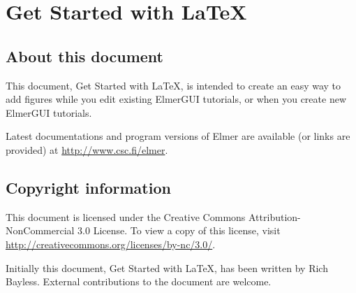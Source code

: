 \chapter*{Get Started with LaTeX}

\section*{About this document}

This document, Get Started with LaTeX, is intended to create an easy
way to add figures while you edit existing ElmerGUI tutorials, or when
you create new ElmerGUI tutorials. 

Latest documentations and program versions of Elmer are available (or links are provided) at 
\url{http://www.csc.fi/elmer}. 

\section*{Copyright information}

This document is licensed under the Creative Commons Attribution-NonCommercial 3.0 License. 
To view a copy of this license, visit \url{http://creativecommons.org/licenses/by-nc/3.0/}.

Initially this document, Get Started with LaTeX, has been written by Rich Bayless.
External contributions to the document are welcome.



